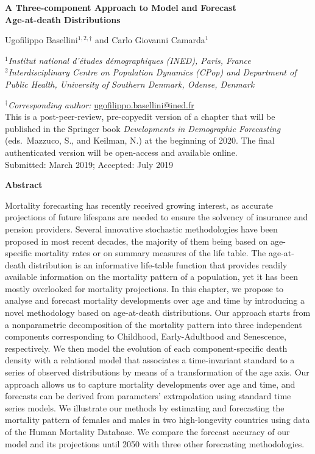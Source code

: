 \documentclass[Thesis]{subfiles}
\begin{document}
\thispagestyle{empty}
{\centering
{\Large\bfseries A Three-component Approach to Model and Forecast \\ Age-at-death Distributions \par}
\vspace{0.5cm}
{\large Ugofilippo Basellini$^{1,2,\dagger}$ and Carlo Giovanni Camarda$^{1}$ \par}
\singlespacing
{\normalsize $^{1}$\itshape Institut national d'\'{e}tudes d\'emographiques (INED), Paris, France\\[2mm]}
{\normalsize $^{2}$\itshape Interdisciplinary Centre on Population Dynamics (CPop) and Department of Public Health, University of Southern Denmark, Odense, Denmark\\[2mm]}
{\normalsize $^{\dagger}${\itshape Corresponding author:} \url{ugofilippo.basellini@ined.fr}\\
\vspace{0.5cm} This is a post-peer-review, pre-copyedit version of a chapter that will be published in the Springer book \textit{Developments in Demographic Forecasting} (eds.~Mazzuco, S., and Keilman, N.) at the beginning of 2020. The final authenticated version will be open-access and available online.\\  
\vspace{0.5cm} Submitted: March 2019; Accepted: July 2019 \par}
\vspace{1.0cm}
{\bfseries Abstract \\[5mm]}
{\normalsize \justify Mortality forecasting has recently received growing interest, as accurate projections of future lifespans are needed to ensure the solvency of insurance and pension providers. Several innovative stochastic methodologies have been proposed in most recent decades, the majority of them being based on age-specific mortality rates or on summary measures of the life table. The age-at-death distribution is an informative life-table function that provides readily available information on the mortality pattern of a population, yet it has been mostly overlooked for mortality projections. In this chapter, we propose to analyse and forecast mortality developments over age and time by introducing a novel methodology based on age-at-death distributions. Our approach starts from a nonparametric decomposition of the mortality pattern into three independent components corresponding to Childhood, Early-Adulthood and Senescence, respectively. We then model the evolution of each component-specific death density with a relational model that associates a time-invariant standard to a series of observed distributions by means of a transformation of the age axis. Our approach allows us to capture mortality developments over age and time, and forecasts can be derived from parameters' extrapolation using standard time series models. We illustrate our methods by estimating and forecasting the mortality pattern of females and males in two high-longevity countries using data of the Human Mortality Database. We compare the forecast accuracy of our model and its projections until 2050 with three other forecasting methodologies.   \par 
}}
\end{document}
